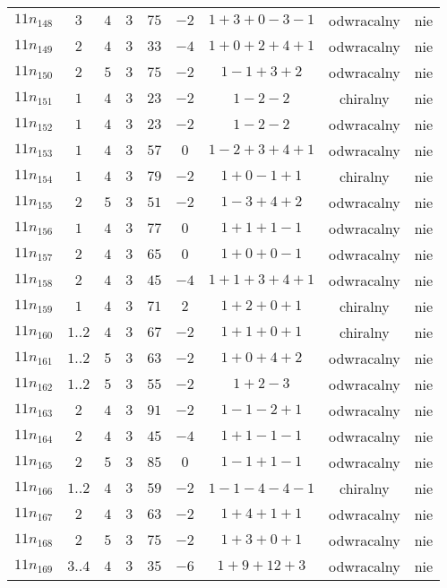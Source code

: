 \begin{longtable}{ccccccccc}
$11n_{148}$ & $3$ & $4$ & $3$ & $75$ & $-2$ & $1+3+0-3-1$ & odwracalny & nie \\
$11n_{149}$ & $2$ & $4$ & $3$ & $33$ & $-4$ & $1+0+2+4+1$ & odwracalny & nie \\
$11n_{150}$ & $2$ & $5$ & $3$ & $75$ & $-2$ & $1-1+3+2$ & odwracalny & nie \\
$11n_{151}$ & $1$ & $4$ & $3$ & $23$ & $-2$ & $1-2-2$ & chiralny & nie \\
$11n_{152}$ & $1$ & $4$ & $3$ & $23$ & $-2$ & $1-2-2$ & odwracalny & nie \\
$11n_{153}$ & $1$ & $4$ & $3$ & $57$ & $0$ & $1-2+3+4+1$ & odwracalny & nie \\
$11n_{154}$ & $1$ & $4$ & $3$ & $79$ & $-2$ & $1+0-1+1$ & chiralny & nie \\
$11n_{155}$ & $2$ & $5$ & $3$ & $51$ & $-2$ & $1-3+4+2$ & odwracalny & nie \\
$11n_{156}$ & $1$ & $4$ & $3$ & $77$ & $0$ & $1+1+1-1$ & odwracalny & nie \\
$11n_{157}$ & $2$ & $4$ & $3$ & $65$ & $0$ & $1+0+0-1$ & odwracalny & nie \\
$11n_{158}$ & $2$ & $4$ & $3$ & $45$ & $-4$ & $1+1+3+4+1$ & odwracalny & nie \\
$11n_{159}$ & $1$ & $4$ & $3$ & $71$ & $2$ & $1+2+0+1$ & chiralny & nie \\
$11n_{160}$ & $1..2$ & $4$ & $3$ & $67$ & $-2$ & $1+1+0+1$ & chiralny & nie \\
$11n_{161}$ & $1..2$ & $5$ & $3$ & $63$ & $-2$ & $1+0+4+2$ & odwracalny & nie \\
$11n_{162}$ & $1..2$ & $5$ & $3$ & $55$ & $-2$ & $1+2-3$ & odwracalny & nie \\
$11n_{163}$ & $2$ & $4$ & $3$ & $91$ & $-2$ & $1-1-2+1$ & odwracalny & nie \\
$11n_{164}$ & $2$ & $4$ & $3$ & $45$ & $-4$ & $1+1-1-1$ & odwracalny & nie \\
$11n_{165}$ & $2$ & $5$ & $3$ & $85$ & $0$ & $1-1+1-1$ & odwracalny & nie \\
$11n_{166}$ & $1..2$ & $4$ & $3$ & $59$ & $-2$ & $1-1-4-4-1$ & chiralny & nie \\
$11n_{167}$ & $2$ & $4$ & $3$ & $63$ & $-2$ & $1+4+1+1$ & odwracalny & nie \\
$11n_{168}$ & $2$ & $5$ & $3$ & $75$ & $-2$ & $1+3+0+1$ & odwracalny & nie \\
$11n_{169}$ & $3..4$ & $4$ & $3$ & $35$ & $-6$ & $1+9+12+3$ & odwracalny & nie \\

\end{longtable}
